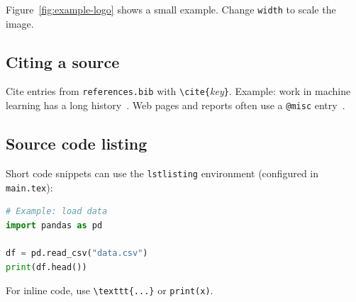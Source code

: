 Figure~\ref{fig:example-logo} shows a small example. Change \texttt{width} to scale the image.

\subsection{Citing a source}

Cite entries from \texttt{references.bib} with \verb|\cite{|\textit{key}\verb|}|. Example: work in machine learning has a long history~\cite{samuel1959some}. Web pages and reports often use a \texttt{@misc} entry~\cite{kuleuven2026home}.

\subsection{Source code listing}

Short code snippets can use the \texttt{lstlisting} environment (configured in \texttt{main.tex}):

\begin{lstlisting}[language=Python, caption={Example Python source.}]
# Example: load data
import pandas as pd

df = pd.read_csv("data.csv")
print(df.head())
\end{lstlisting}

For inline code, use \verb|\texttt{...}| or \lstinline{print(x)}.
